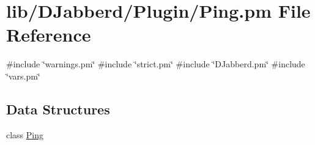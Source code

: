 \hypertarget{_ping_8pm}{
\section{lib/\-D\-Jabberd/\-Plugin/\-Ping.pm \-File \-Reference}
\label{_ping_8pm}
}
{\ttfamily \#include \char`\"{}warnings.\-pm\char`\"{}}\*
{\ttfamily \#include \char`\"{}strict.\-pm\char`\"{}}\*
{\ttfamily \#include \char`\"{}\-D\-Jabberd.\-pm\char`\"{}}\*
{\ttfamily \#include \char`\"{}vars.\-pm\char`\"{}}\*
\subsection*{\-Data \-Structures}
\begin{DoxyCompactItemize}
\item 
class \hyperlink{class_d_jabberd_1_1_plugin_1_1_ping}{\-Ping}
\end{DoxyCompactItemize}
